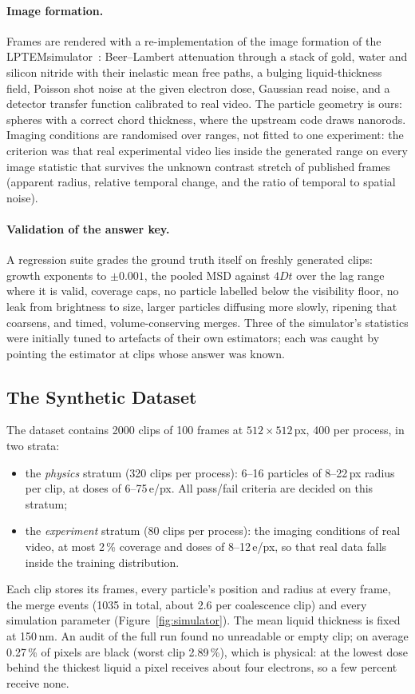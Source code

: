 \paragraph{Image formation.} Frames are rendered with a re-implementation of the image
formation of the LPTEMsimulator~\cite{lptemsim}: Beer--Lambert attenuation through a
stack of gold, water and silicon nitride with their inelastic mean free paths, a bulging
liquid-thickness field, Poisson shot noise at the given electron dose, Gaussian read
noise, and a detector transfer function calibrated to real video. The particle geometry
is ours: spheres with a correct chord thickness, where the upstream code draws nanorods.
Imaging conditions are randomised over ranges, not fitted to one experiment: the
criterion was that real experimental video lies inside the generated range on every
image statistic that survives the unknown contrast stretch of published frames
(apparent radius, relative temporal change, and the ratio of temporal to spatial noise).

\paragraph{Validation of the answer key.} A regression suite grades the ground truth
itself on freshly generated clips: growth exponents to $\pm 0.001$, the pooled MSD
against $4Dt$ over the lag range where it is valid, coverage caps, no particle labelled
below the visibility floor, no leak from brightness to size, larger particles diffusing
more slowly, ripening that coarsens, and timed, volume-conserving merges. Three of the
simulator's statistics were initially tuned to artefacts of their own estimators; each
was caught by pointing the estimator at clips whose answer was known.

\subsection{The Synthetic Dataset}
\label{sec:dataset}

The dataset contains 2000 clips of 100 frames at $512 \times 512$\,px, 400 per process,
in two strata:
\begin{itemize}
  \item the \emph{physics} stratum (320 clips per process): 6--16 particles of
    8--22\,px radius per clip, at doses of 6--75\,e/px. All pass/fail criteria are
    decided on this stratum;
  \item the \emph{experiment} stratum (80 clips per process): the imaging conditions of
    real video, at most 2\,\% coverage and doses of 8--12\,e/px, so that real data falls
    inside the training distribution.
\end{itemize}
Each clip stores its frames, every particle's position and radius at every frame, the
merge events (1035 in total, about 2.6 per coalescence clip) and every simulation
parameter (Figure~\ref{fig:simulator}). The mean liquid thickness is fixed at 150\,nm. An audit of the full run found
no unreadable or empty clip; on average 0.27\,\% of pixels are black (worst clip
2.89\,\%), which is physical: at the lowest dose behind the thickest liquid a pixel
receives about four electrons, so a few percent receive none.

